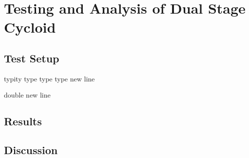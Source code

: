 
\chapter{Testing and Analysis of Dual Stage Cycloid}\label{ch:dual}


\section{Test Setup} \label{dual:test_setupd}

typity type type type
new line

double new line 

\section{Results} \label{dual:results}

\section{Discussion} \label{dual:discussion}
